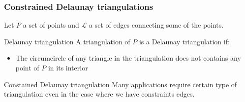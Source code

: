\documentclass[10pt]{beamer}
\begin{document}
%	
\begin{frame}
	\frametitle{Constrained Delaunay triangulations}
	Let $P$ a set of points and $\mathcal{L}$ a set of  edges connecting some of the points.
	\begin{block}{Delaunay triangulation}
  A triangulation of $P$ is a Delaunay triangulation if:
  \begin{itemize}
  	\item The circumcircle of any triangle in the triangulation does not contains any point of $P$ in its interior
  \end{itemize}
		
		
	\end{block}
\pause
\begin{block}{Constained Delaunay triangulation}
Many applications require certain type of triangulation even in the case where we have constraints edges.
\end{block}
\end{frame}
\end{document}
